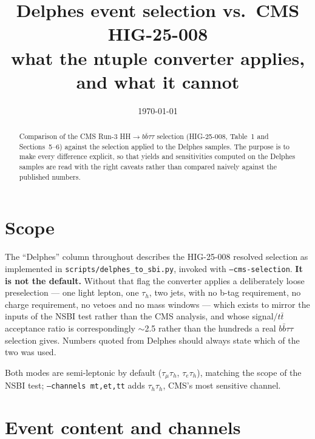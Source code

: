 \documentclass[11pt,a4paper]{article}
\title{\vspace{-1.5cm}Delphes event selection vs.\ CMS HIG-25-008\\
\large what the ntuple converter applies, and what it cannot}
\author{}
\date{\today}
\newcommand{\tauh}{\tau_{h}}
\begin{document}
\maketitle
\vspace{-0.8cm}

\begin{abstract}
\noindent
Comparison of the CMS Run-3 HH$\rightarrow b\bar b\tau\tau$ selection (HIG-25-008,
Table~1 and Sections~5--6) against the selection applied to the Delphes samples. The
purpose is to make every difference explicit, so that yields and sensitivities computed
on the Delphes samples are read with the right caveats rather than compared naively
against the published numbers.
\end{abstract}

\section{Scope}

The ``Delphes'' column throughout describes the HIG-25-008 resolved selection as
implemented in \texttt{scripts/delphes\_to\_sbi.py}, invoked with
\texttt{--cms-selection}. \textbf{It is not the default.} Without that flag the
converter applies a deliberately loose preselection --- one light lepton, one $\tauh$,
two jets, with no b-tag requirement, no charge requirement, no vetoes and no mass
windows --- which exists to mirror the inputs of the NSBI test rather than the CMS
analysis, and whose signal$/t\bar t$ acceptance ratio is correspondingly $\sim$2.5
rather than the hundreds a real $b\bar b\tau\tau$ selection gives. Numbers quoted from
Delphes should always state which of the two was used.

Both modes are semi-leptonic by default ($\tau_\mu\tauh$, $\tau_e\tauh$), matching the
scope of the NSBI test; \texttt{--channels mt,et,tt} adds $\tauh\tauh$, CMS's most
sensitive channel.

\section{Event content and channels}
\end{document}
